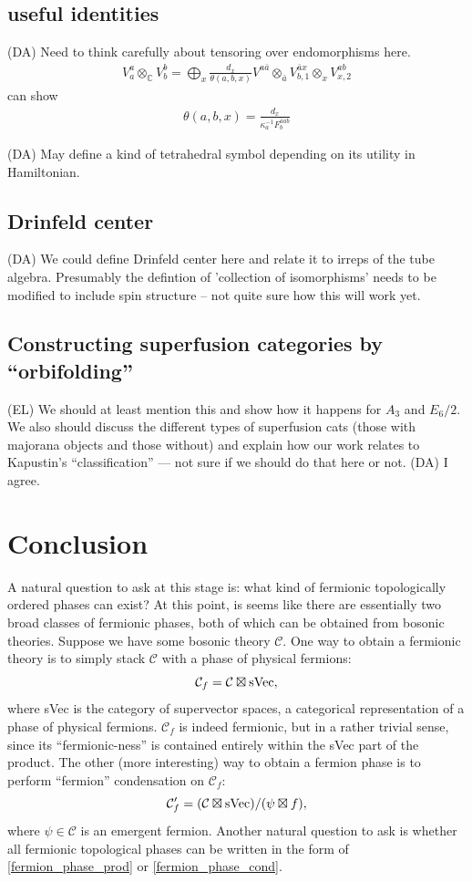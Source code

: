\documentclass[12pt,a4paper]{article}
\newcommand{\tp}{\otimes}
\newcommand\be            {\begin{equation}}
\newcommand\ee            {\end{equation}}
\newcommand{\mcc}{\mathcal{C}}
\newcommand{\dave}[1]{{\color{ao(english)}\footnotesize{(DA) #1}}}
\newcommand{\ethan}[1]{{\color{amethyst}\footnotesize{(EL) #1}}}
\begin{document}
\subsection{useful identities}

\dave{Need to think carefully about tensoring over endomorphisms here.}
\begin{align}
V^a_a \tp_{\mathbb{C}} V^b_b = \bigoplus_x \frac{d_x}{\theta(a,b,x)} V^{a \bar{a}} \tp_{\bar{a}}V^{\bar{a}x}_{b,1} \tp_x V^{ab}_{x,2}
\end{align}
can show
\begin{align}
\theta(a,b,x) = \frac{d_x}{\kappa_a^{-1} F^{\bar{a} a b}_b}
\end{align}

\dave{May define a kind of tetrahedral symbol depending on its utility in Hamiltonian.}

\subsection{Drinfeld center}
\dave{We could define Drinfeld center here and relate it to irreps of the tube algebra. Presumably the defintion of 'collection of isomorphisms' needs to be modified to include spin structure -- not quite sure how this will work yet. }

\subsection{Constructing superfusion categories by ``orbifolding''}
\ethan{We should at least mention this and show how it happens for $A_3$ and $E_6/2$. We also should discuss the different types of superfusion cats (those with majorana objects and those without) and explain how our work relates to Kapustin's ``classification'' --- not sure if we should do that here or not. }
\dave{I agree.}

\section{Conclusion}

A natural question to ask at this stage is: what kind of fermionic topologically ordered phases can exist? At this point, is seems like there are essentially two broad classes of fermionic phases, both of which can be obtained from bosonic theories. Suppose we have some bosonic theory $\mcc$. One way to obtain a fermionic theory is to simply stack $\mcc$ with a phase of physical fermions:
\be \label{fermion_phase_prod} \mcc_f = \mcc \boxtimes {\rm sVec}, \ee
where sVec is the category of supervector spaces, a categorical representation of a phase of physical fermions. $\mcc_f$ is indeed fermionic, but in a rather trivial sense, since its ``fermionic-ness'' is contained entirely within the sVec part of the product. The other (more interesting) way to obtain a fermion phase is to perform ``fermion'' condensation on $\mcc_f$:
\be \label{fermion_phase_cond} \mcc_f' = (\mcc \boxtimes {\rm sVec}) / (\psi \boxtimes f),\ee
where $\psi \in \mcc$ is an emergent fermion. 
Another natural question to ask is whether all fermionic topological phases can be written in the form of \eqref{fermion_phase_prod} or \eqref{fermion_phase_cond}. 
\end{document}
